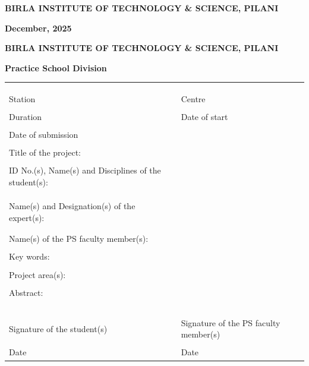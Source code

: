 \documentclass{book}
\begin{document}
	\centerline{\bf BIRLA INSTITUTE OF TECHNOLOGY \& SCIENCE, PILANI}
	\vspace*{0.5cm}
	\centerline{\bf December, 2025} %
	\newpage

\thispagestyle{empty}

	\centerline{\bf BIRLA INSTITUTE OF TECHNOLOGY \& SCIENCE, PILANI}
	\vspace*{0.2cm}
	\centerline{\bf Practice School Division}
	\vspace*{0.3cm}
	{\bf 
		\begin{tabular}{p{6cm}l}
			& \\
			& \\
			& \\
			Station & \hspace*{3cm} Centre \\ %
			& \\
			Duration &\hspace*{3cm} Date of start \\ %
			& \\
			Date of submission & {} \\ %
			& \\
			Title of the project: & \\ %
			& \\
			ID No.(s), Name(s) and Disciplines of the student(s): & \\
			& \\ %
			& \\ %
			& \\ %
			Name(s) and Designation(s) of the expert(s): & \\
			& \\ %
			& \\ %
			Name(s) of the PS faculty member(s): & \\
			& \\ %
			Key words: & \\ %
			& \\
			Project area(s):  & \\ %
			& \\
			Abstract: & \\ %
			& \\
			& \\
			& \\
			& \\
			& \\
			Signature of the student(s) & \hspace*{1cm}Signature of the PS faculty member(s) \\
			& \\
			Date & \hspace*{1cm}Date \\ %
		\end{tabular}}
\end{document}
